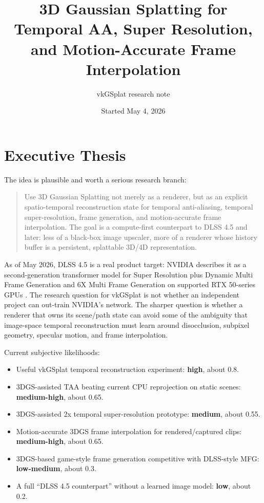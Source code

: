 \documentclass[11pt]{article}
\title{3D Gaussian Splatting for Temporal AA, Super Resolution, and Motion-Accurate Frame Interpolation}
\author{vkGSplat research note}
\date{Started May 4, 2026}
\begin{document}
\maketitle

\section{Executive Thesis}

The idea is plausible and worth a serious research branch:

\begin{quote}
Use 3D Gaussian Splatting not merely as a renderer, but as an explicit
spatio-temporal reconstruction state for temporal anti-aliasing, temporal
super-resolution, frame generation, and motion-accurate frame interpolation.
The goal is a compute-first counterpart to DLSS 4.5 and later: less of a
black-box image upscaler, more of a renderer whose history buffer is a
persistent, splattable 3D/4D representation.
\end{quote}

As of May 2026, DLSS 4.5 is a real product target: NVIDIA describes it as a
second-generation transformer model for Super Resolution plus Dynamic Multi
Frame Generation and 6X Multi Frame Generation on supported RTX 50-series GPUs
\cite{nvidia2026dlss45,nvidia2026dlssdeveloper}. The research question for
vkGSplat is not whether an independent project can out-train NVIDIA's network.
The sharper question is whether a renderer that owns its scene/path state can
avoid some of the ambiguity that image-space temporal reconstruction must learn
around disocclusion, subpixel geometry, specular motion, and frame interpolation.

Current subjective likelihoods:

\begin{itemize}
  \item Useful vkGSplat temporal reconstruction experiment: \textbf{high}, about 0.8.
  \item 3DGS-assisted TAA beating current CPU reprojection on static scenes: \textbf{medium-high}, about 0.65.
  \item 3DGS-assisted 2x temporal super-resolution prototype: \textbf{medium}, about 0.55.
  \item Motion-accurate 3DGS frame interpolation for rendered/captured clips: \textbf{medium-high}, about 0.65.
  \item 3DGS-based game-style frame generation competitive with DLSS-style MFG: \textbf{low-medium}, about 0.3.
  \item A full ``DLSS 4.5 counterpart'' without a learned image model: \textbf{low}, about 0.2.
\end{itemize}
\end{document}
